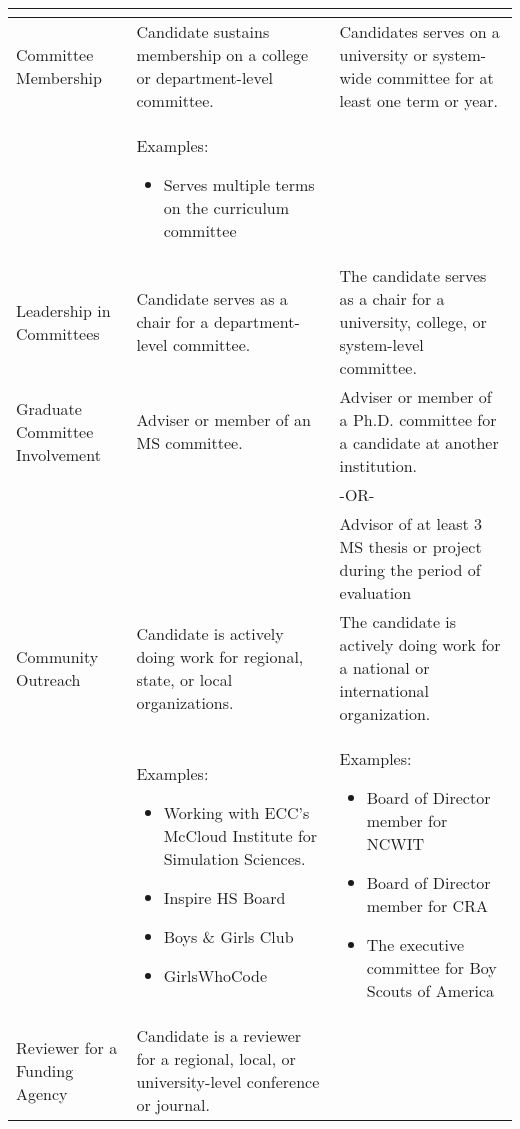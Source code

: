 \documentclass{scrartcl}
\begin{document}
\begin{longtable}{p{3cm}p{5.5cm}P{5.5cm}}
\begin{itemize}[noitemsep,leftmargin=*,topsep=0pt,partopsep=0pt]
	\end{itemize} & \\ \hline
Committee Membership & Candidate sustains membership on a college or department-level committee. & Candidates serves on a university or system-wide committee for at least one term or year. \\
& Examples:
	\begin{itemize}[noitemsep,leftmargin=*,topsep=0pt,partopsep=0pt]
    \item Serves multiple terms on the curriculum committee
	\end{itemize} & \\ \hline
Leadership in Committees & Candidate serves as a chair for a department-level committee. & The candidate serves as a chair for a university, college, or system-level committee. \\ \hline
Graduate Committee Involvement & Adviser or member of an MS committee. & Adviser or member of a Ph.D. committee for a candidate at another institution.\\ 
& & -OR- \\
& & Advisor of at least 3 MS thesis or project during the period of evaluation \\
\hline
 Community Outreach & Candidate is actively doing work for regional, state, or local organizations. & The candidate is actively doing work for a national or international organization. \\
 &
 Examples:
	\begin{itemize}[noitemsep,leftmargin=*,topsep=0pt,partopsep=0pt]
    \item Working with ECC’s McCloud Institute for Simulation Sciences.
    \item Inspire HS Board
    \item Boys \& Girls Club
    \item GirlsWhoCode
	\end{itemize}
  & %
  Examples:
    \begin{itemize}[noitemsep,leftmargin=*,topsep=0pt,partopsep=0pt]
        \item Board of Director member for NCWIT
        \item Board of Director member for CRA
        \item The executive committee for Boy Scouts of America
    \end{itemize}\\ 
\hline
 Reviewer for a Funding Agency
 & Candidate is a reviewer for a regional, local, or university-level conference or journal.%

\end{longtable}
\end{document}
